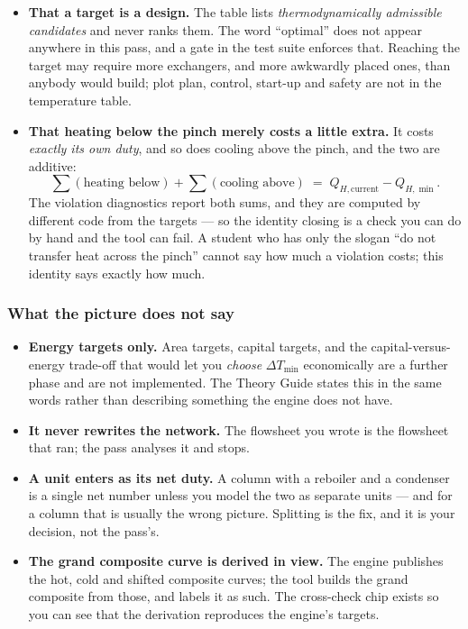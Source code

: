 \documentclass[11pt,a4paper]{article}
\begin{document}
\begin{itemize}[leftmargin=*,nosep,topsep=4pt]
  \item \textbf{That a target is a design.}  The table lists
        \emph{thermodynamically admissible candidates} and never ranks
        them.  The word ``optimal'' does not appear anywhere in this pass,
        and a gate in the test suite enforces that.  Reaching the target
        may require more exchangers, and more awkwardly placed ones, than
        anybody would build; plot plan, control, start-up and safety are
        not in the temperature table.
  \item \textbf{That heating below the pinch merely costs a little
        extra.}  It costs \emph{exactly its own duty}, and so does cooling
        above the pinch, and the two are additive:
        \[
          \sum(\text{heating below}) + \sum(\text{cooling above})
          \;=\; Q_{H,\mathrm{current}} - Q_{H,\min}.
        \]
        The violation diagnostics report both sums, and they are computed
        by different code from the targets --- so the identity closing is
        a check you can do by hand and the tool can fail.  A student who
        has only the slogan ``do not transfer heat across the pinch''
        cannot say how much a violation costs; this identity says exactly
        how much.
\end{itemize}

\subsubsection*{What the picture does not say}

\begin{itemize}[leftmargin=*,nosep]
  \item \textbf{Energy targets only.}  Area targets, capital targets, and
        the capital-versus-energy trade-off that would let you
        \emph{choose} $\Delta T_{\min}$ economically are a further phase
        and are not implemented.  The Theory Guide states this in the same
        words rather than describing something the engine does not have.
  \item \textbf{It never rewrites the network.}  The flowsheet you wrote
        is the flowsheet that ran; the pass analyses it and stops.
  \item \textbf{A unit enters as its net duty.}  A column with a reboiler
        and a condenser is a single net number unless you model the two as
        separate units --- and for a column that is usually the wrong
        picture.  Splitting is the fix, and it is your decision, not the
        pass's.
  \item \textbf{The grand composite curve is derived in view.}  The engine
        publishes the hot, cold and shifted composite curves; the tool
        builds the grand composite from those, and labels it as such.  The
        cross-check chip exists so you can see that the derivation
        reproduces the engine's targets.
\end{itemize}
\end{document}
